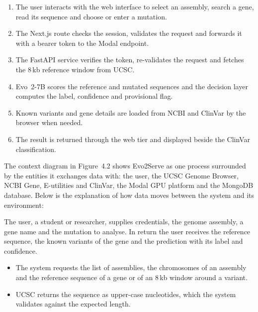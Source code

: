 \begin{enumerate}
\item The user interacts with the web interface to select an assembly, search a gene, read its sequence and choose or enter a mutation.
\item The Next.js route checks the session, validates the request and forwards it with a bearer token to the Modal endpoint.
\item The FastAPI service verifies the token, re-validates the request and fetches the 8\,kb reference window from UCSC.
\item Evo~2-7B scores the reference and mutated sequences and the decision layer computes the label, confidence and provisional flag.
\item Known variants and gene details are loaded from NCBI and ClinVar by the browser when needed.
\item The result is returned through the web tier and displayed beside the ClinVar classification.
\end{enumerate}

The context diagram in Figure~4.2 shows Evo2Serve as one process surrounded by the entities it exchanges data with: the user, the UCSC Genome Browser, NCBI Gene, E-utilities and ClinVar, the Modal GPU platform and the MongoDB database. Below is the explanation of how data moves between the system and its environment:

\vspace{-2pt}
\begin{center}\diagDFDzero\end{center}\label{fig:4.2}
\vspace{-12pt}
\vspace{-2pt}

The user, a student or researcher, supplies credentials, the genome assembly, a gene name and the mutation to analyse. In return the user receives the reference sequence, the known variants of the gene and the prediction with its label and confidence.

\begin{itemize}
\item The system requests the list of assemblies, the chromosomes of an assembly and the reference sequence of a gene or of an 8\,kb window around a variant.
\item UCSC returns the sequence as upper-case nucleotides, which the system validates against the expected length.
\end{itemize}

